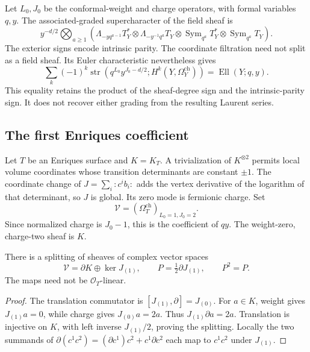 Let \(L_0,J_0\) be the conformal-weight and charge operators,
with formal variables \(q,y\).  The associated-graded
supercharacter of the field sheaf is
\begin{equation}\label{eq:zbps-field-symbol}
 y^{-d/2}\bigotimes_{a\ge1}
 \left(\Lambda_{-yq^{a-1}}T_Y^*
 \otimes\Lambda_{-y^{-1}q^a}T_Y
 \otimes\operatorname{Sym}_{q^a}T_Y^*
 \otimes\operatorname{Sym}_{q^a}T_Y\right).
\end{equation}
The exterior signs encode intrinsic parity.  The coordinate
filtration need not split as a field sheaf.  Its Euler
characteristic nevertheless gives
\[
 \sum_k(-1)^k\operatorname{str}
 \left(q^{L_0}y^{J_0-d/2};H^k(Y,\Omega_Y^{\mathrm{ch}})\right)
 =\operatorname{Ell}(Y;q,y).
\]
This equality retains the product of the sheaf-degree sign and the
intrinsic-parity sign.  It does not recover either grading from
the resulting Laurent series.

\subsection{The first Enriques coefficient}

Let \(T\) be an Enriques surface and \(K=K_T\).  A trivialization
of \(K^{\otimes2}\) permits local volume coordinates whose
transition determinants are constant \(\pm1\).  The coordinate
change of \(J=\sum_i:c^i b_i:\) adds the vertex derivative of the
logarithm of that determinant, so \(J\) is global.  Its zero mode
is fermionic charge.  Set
\[
 \mathscr V=(\Omega_T^{\mathrm{ch}})_{L_0=1,J_0=2}.
\]
Since normalized charge is \(J_0-1\), this is the coefficient of
\(qy\).  The weight-zero, charge-two sheaf is \(K\).

\begin{proposition}\label{prop:zbps-enriques-projector}
There is a splitting of sheaves of complex vector spaces
\[
 \mathscr V=\partial K\oplus\ker J_{(1)},
 \qquad P=\tfrac12\partial J_{(1)},\qquad P^2=P.
\]
The maps need not be \(\mathcal O_T\)-linear.
\end{proposition}
\begin{proof}
The translation commutator is
\([J_{(1)},\partial]=J_{(0)}\).  For \(a\in K\), weight gives
\(J_{(1)}a=0\), while charge gives \(J_{(0)}a=2a\).
Thus \(J_{(1)}\partial a=2a\).  Translation is injective on
\(K\), with left inverse \(J_{(1)}/2\), proving the splitting.
Locally the two summands of
\(\partial(c^1c^2)=(\partial c^1)c^2+c^1\partial c^2\)
each map to \(c^1c^2\) under \(J_{(1)}\).
\end{proof}


